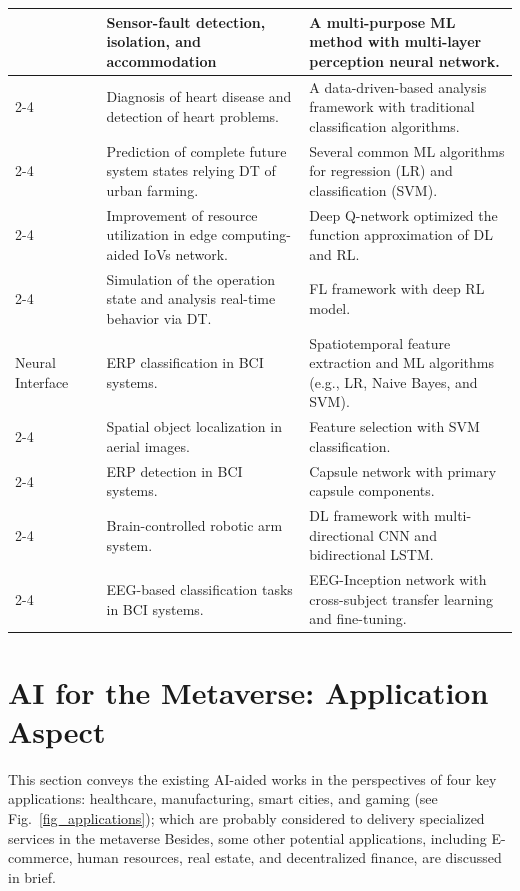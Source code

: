 \documentclass[journal]{IEEEtran}
\begin{document}
\begin{table}[ht!]
\begin{tabular}{|p{2.10cm}|p{0.75cm}|p{5.75cm}|p{7.85cm}|}
&\cite{darvishi2021sensor}	&Sensor-fault detection, isolation, and accommodation	& A multi-purpose ML method with multi-layer perception neural network.\\  \cline{2-4}
&\cite{elayan2021digital}	&Diagnosis of heart disease and detection of heart problems.	& A data-driven-based analysis framework with traditional classification algorithms.\\ \cline{2-4}
&\cite{ghandar2021adecision}	&Prediction of complete future system states relying DT of urban farming.	& Several common ML algorithms for regression (LR) and classification (SVM).\\ \cline{2-4}
&\cite{xu2022service}	&Improvement of resource utilization in edge computing-aided IoVs network.	& Deep Q-network optimized the function approximation of DL and RL.\\ \cline{2-4}
&\cite{sun2021adaptive}	&Simulation of the operation state and analysis real-time behavior via DT.	& FL framework with deep RL model. \\  \hline\hline
  
Neural Interface 

& \cite{abibullaev2019learning} & ERP classification in BCI systems. & Spatiotemporal feature extraction and ML algorithms (e.g., LR, Naive Bayes, and SVM). \\ \cline{2-4}
& \cite{matran2016brain} &  Spatial object localization in aerial images. & Feature selection with SVM classification. \\ \cline{2-4}
& \cite{ma2021capsule} & ERP detection in BCI systems. & Capsule network with primary capsule components. \\ \cline{2-4}
& \cite{jeong2020brain} & Brain-controlled robotic arm system. & DL framework with multi-directional CNN and bidirectional LSTM. \\ \cline{2-4}
& \cite{santamaria2020eeg} & EEG-based classification tasks in BCI systems. &  EEG-Inception network with cross-subject transfer learning and fine-tuning.   \\  \hline\hline
\end{tabular}%
\label{tab_technicalAspect}
\end{table}

\section{AI for the Metaverse: Application Aspect}
\label{sec_Application}

This section conveys the existing AI-aided works in the perspectives of four key applications: healthcare, manufacturing, smart cities, and gaming (see Fig.~\ref{fig_applications}); which are probably considered to delivery specialized services in the metaverse 
Besides, some other potential applications, including E-commerce, human resources, real estate, and decentralized finance, are discussed in brief.
\end{document}
